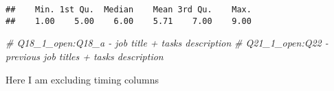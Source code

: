 \documentclass[]{article}
\newenvironment{Shaded}{\begin{snugshade}}{\end{snugshade}}
\newcommand{\KeywordTok}[1]{\textcolor[rgb]{0.13,0.29,0.53}{\textbf{{#1}}}}
\newcommand{\DecValTok}[1]{\textcolor[rgb]{0.00,0.00,0.81}{{#1}}}
\newcommand{\StringTok}[1]{\textcolor[rgb]{0.31,0.60,0.02}{{#1}}}
\newcommand{\CommentTok}[1]{\textcolor[rgb]{0.56,0.35,0.01}{\textit{{#1}}}}
\newcommand{\NormalTok}[1]{{#1}}
\begin{document}
\begin{Shaded}
\end{Shaded}

\begin{verbatim}
##    Min. 1st Qu.  Median    Mean 3rd Qu.    Max. 
##    1.00    5.00    6.00    5.71    7.00    9.00
\end{verbatim}

\begin{Shaded}
\begin{Highlighting}[]
\CommentTok{# Q18_1_open:Q18_a - job title + tasks description}
\CommentTok{# Q21_1_open:Q22 - previous job titles + tasks description}
\end{Highlighting}
\end{Shaded}

Here I am excluding timing columns

\begin{Shaded}
\end{Shaded}
\end{document}
